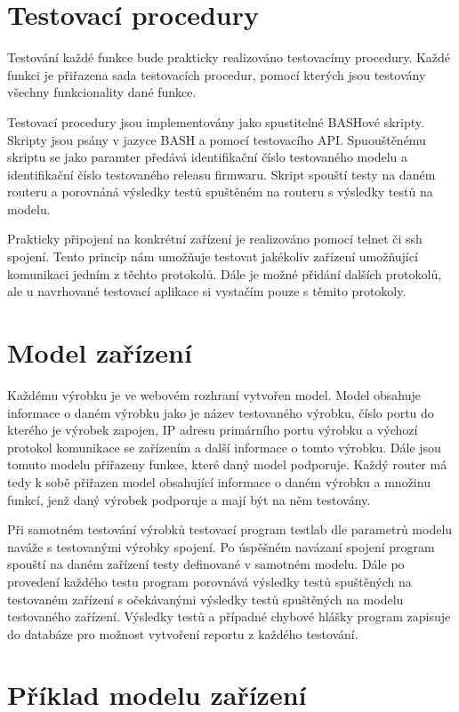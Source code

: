 \section{Testovací procedury}

Testování každé funkce bude prakticky realizováno testovacímy procedury. Každé funkci je přiřazena sada testovacích procedur, pomocí kterých jsou testovány všechny funkcionality dané funkce.

Testovací procedury jsou implementovány jako spustitelné BASHové skripty. Skripty jsou psány v jazyce BASH a pomocí testovacího API. Spuouštěnému skriptu se jako paramter předává identifikační číslo testovaného modelu a identifikační číslo testovaného releasu firmwaru. Skript spouští testy na daném routeru a porovnáná výsledky testů spuštěném na routeru s výsledky testů na modelu.

Prakticky připojení na konkrétní zařízení je realizováno pomocí telnet či ssh spojení. Tento princip nám umožňuje testovat jakékoliv zařízení umožňující komunikaci jedním z těchto protokolů. Dále je možné přidání dalších protokolů, ale u navrhované testovací aplikace si vystačím pouze s těmito protokoly.

\section{Model zařízení}

Každému výrobku je ve webovém rozhraní vytvořen model. Model obsahuje informace o daném výrobku jako je název testovaného výrobku, číslo portu do kterého je výrobek zapojen, IP adresu primárního portu výrobku a výchozí protokol komunikace se zařízením a další informace o tomto výrobku. Dále jsou tomuto modelu přiřazeny funkce, které daný model podporuje. Každý router má tedy k sobě přiřazen model obsahující informace o daném výrobku a množinu funkcí, jenž daný výrobek podporuje a mají být na něm testovány.

Při samotném testování výrobků testovací program testlab dle parametrů modelu  naváže s testovanými výrobky spojení. Po úspěšném navázaní spojení program spouští na daném zařízení testy definované v samotném modelu. Dále po provedení každého testu program porovnává výsledky testů spuštěných na testovaném zařízení s očekávanými výsledky testů spuštěných na modelu testovaného zařízení. Výsledky testů a případné chybové hlášky program zapisuje do databáze pro možnost vytvoření reportu z každého testování.

\section{Příklad modelu zařízení}

